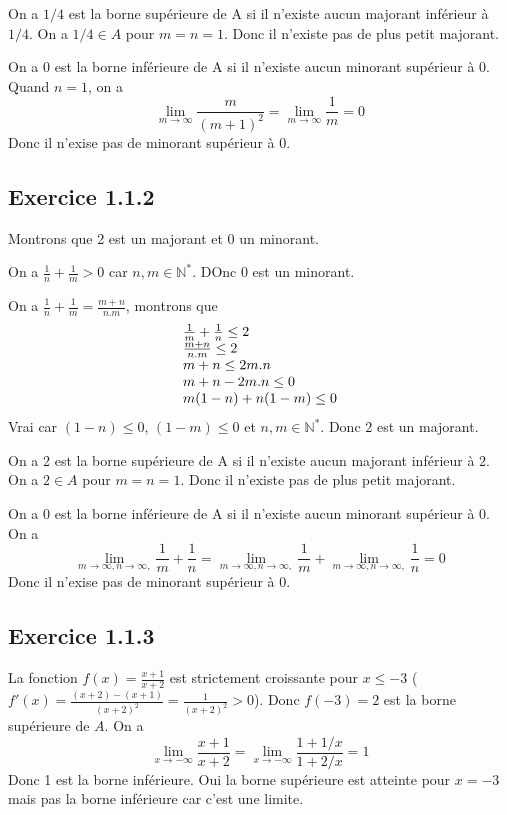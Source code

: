 \documentclass[]{book}
\theoremstyle{definition}
\newcommand{\bb}[1]{\mathbb{#1}}
\newcommand{\N}{\bb{N}}
\begin{document}
On a $1/4$ est la borne sup\'erieure de A si il n'existe aucun majorant inf\'erieur \`a $1/4$. On a $1/4 \in A$ pour $m=n=1$. Donc il n'existe pas de plus petit majorant.

On a 0 est la borne inf\'erieure de A si il n'existe aucun minorant sup\'erieur \`a $0$. Quand $n=1$, on a 
$$\lim_{m \to \infty}\frac{m}{(m+1)^2} = \lim_{m \to \infty}\frac{1}{m} = 0$$
Donc il n'exise pas de minorant sup\'erieur \`a 0.

\subsection*{Exercice 1.1.2}
Montrons que 2 est un majorant et 0 un minorant.

On a $\frac{1}{n}+\frac{1}{m}>0$ car $n,m \in \N^{*}$. DOnc 0 est un minorant.

On a $\frac{1}{n}+\frac{1}{m} = \frac{m+n}{n.m}$, montrons que 
$$
\begin{array}{l l}
\frac{1}{m} +  \frac{1}{n} \leq 2 \\
\frac{m+n}{n.m} \leq 2 \\
m+n \leq 2m.n \\
m+n-2m.n \leq 0 \\
m(1-n)+n(1-m) \leq 0 \\
\end{array}
$$
Vrai car $(1-n) \leq 0$, $(1-m) \leq 0$ et $n,m \in \N^{*}$. Donc $2$ est un majorant.

On a 2 est la borne sup\'erieure de A si il n'existe aucun majorant inf\'erieur \`a $2$. On a $2 \in A$ pour $m=n=1$. Donc il n'existe pas de plus petit majorant.

On a 0 est la borne inf\'erieure de A si il n'existe aucun minorant sup\'erieur \`a $0$. On a 
$$\lim_{m \to \infty, n \to \infty,}\frac{1}{m} + \frac{1}{n} = \lim_{m \to \infty, n \to \infty,}\frac{1}{m} + \lim_{m \to \infty, n \to \infty,} \frac{1}{n} = 0$$
Donc il n'exise pas de minorant sup\'erieur \`a 0.


\subsection*{Exercice 1.1.3}
La fonction $f(x)=\frac{x+1}{x+2}$ est strictement croissante pour $x \leq -3$ ($f'(x) = \frac{(x+2)-(x+1)}{(x+2)^2} = \frac{1}{(x+2)^2} > 0$). Donc $f(-3) =  2$ est la borne sup\'erieure de $A$. On a 
$$\lim_{x \to -\infty} \frac{x+1}{x+2} = \lim_{x \to -\infty} \frac{1+1/x}{1+2/x} = 1$$
Donc 1 est la borne inf\'erieure.
Oui la borne sup\'erieure est atteinte pour $x=-3$ mais pas la borne inf\'erieure car c'est une limite.
\end{document}
